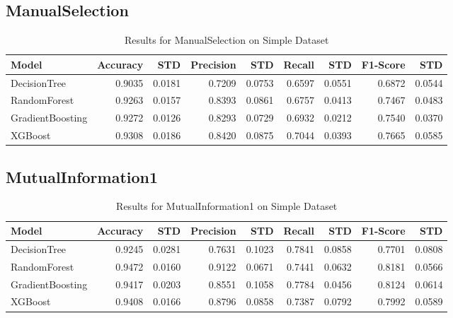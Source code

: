 \documentclass{article}
\begin{document}
\subsection{ManualSelection}
\begin{table}[h!]
\centering
\caption{Results for ManualSelection on Simple Dataset}
\begin{tabular}{l|rr|rr|rr|rr}
\hline
Model & Accuracy & STD & Precision & STD & Recall & STD & F1-Score & STD \\
\hline
DecisionTree & 0.9035 & 0.0181 & 0.7209 & 0.0753 & 0.6597 & 0.0551 & 0.6872 & 0.0544 \\
RandomForest & 0.9263 & 0.0157 & 0.8393 & 0.0861 & 0.6757 & 0.0413 & 0.7467 & 0.0483 \\
GradientBoosting & 0.9272 & 0.0126 & 0.8293 & 0.0729 & 0.6932 & 0.0212 & 0.7540 & 0.0370 \\
XGBoost & 0.9308 & 0.0186 & 0.8420 & 0.0875 & 0.7044 & 0.0393 & 0.7665 & 0.0585 \\
\hline
\end{tabular}
\end{table}

\subsection{MutualInformation1}
\begin{table}[h!]
\centering
\caption{Results for MutualInformation1 on Simple Dataset}
\begin{tabular}{l|rr|rr|rr|rr}
\hline
Model & Accuracy & STD & Precision & STD & Recall & STD & F1-Score & STD \\
\hline
DecisionTree & 0.9245 & 0.0281 & 0.7631 & 0.1023 & 0.7841 & 0.0858 & 0.7701 & 0.0808 \\
RandomForest & 0.9472 & 0.0160 & 0.9122 & 0.0671 & 0.7441 & 0.0632 & 0.8181 & 0.0566 \\
GradientBoosting & 0.9417 & 0.0203 & 0.8551 & 0.1058 & 0.7784 & 0.0456 & 0.8124 & 0.0614 \\
XGBoost & 0.9408 & 0.0166 & 0.8796 & 0.0858 & 0.7387 & 0.0792 & 0.7992 & 0.0589 \\
\hline
\end{tabular}
\end{table}
\end{document}
